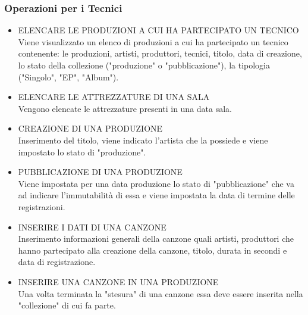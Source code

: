 \documentclass{article}
\newcounter{counteroperazioni}
\newcommand{\coperazioni}{\addtocounter{counteroperazioni}{1}\thecounteroperazioni}
\begin{document}
\subsubsection{Operazioni per i Tecnici}
\begin{itemize}[labelindent=1.5em,labelsep=.5cm,leftmargin=*]
    \item [\textbf{T\coperazioni)}] ELENCARE LE PRODUZIONI A CUI HA PARTECIPATO UN TECNICO \\ Viene visualizzato un elenco di produzioni a cui ha partecipato un tecnico contenente: le produzioni, artisti, produttori, tecnici, titolo, data di creazione, lo stato della collezione ("produzione" o "pubblicazione"), la tipologia ("Singolo", "EP", "Album").
    \item [\textbf{T\coperazioni)}] ELENCARE LE ATTREZZATURE DI UNA SALA \\ Vengono elencate le attrezzature presenti in una data sala.
    \item [\textbf{T\coperazioni)}] CREAZIONE DI UNA PRODUZIONE \\ Inserimento del titolo, viene indicato l'artista che la possiede e viene impostato lo stato di "produzione".
    \item [\textbf{T\coperazioni)}] PUBBLICAZIONE DI UNA PRODUZIONE \\ Viene impostata per una data produzione lo stato di "pubblicazione" che va ad indicare l'immutabilità di essa e viene impostata la data di termine delle registrazioni. 
    \item [\textbf{T\coperazioni)}] INSERIRE I DATI DI UNA CANZONE\\ Inserimento informazioni generali della canzone quali artisti, produttori che hanno partecipato alla creazione della canzone, titolo, durata in secondi e data di registrazione.
    \item [\textbf{T\coperazioni)}] INSERIRE UNA CANZONE IN UNA PRODUZIONE \\ Una volta terminata la "stesura" di una canzone essa deve essere inserita nella "collezione" di cui fa parte.
\end{itemize}
\end{document}
